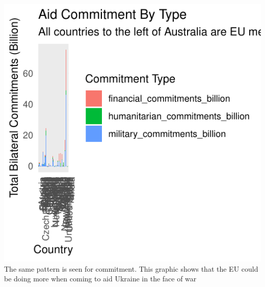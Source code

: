 \documentclass[11pt,preprint, authoryear]{elsarticle}
\numberwithin{equation}{section}
\numberwithin{figure}{section}
\numberwithin{table}{section}
\begin{document}
\begin{Shaded}
\begin{Highlighting}[]
\end{Highlighting}
\end{Shaded}

\includegraphics{Question_3_files/figure-latex/unnamed-chunk-4-1.pdf}
The same pattern is seen for commitment. This graphic shows that the EU
could be doing more when coming to aid Ukraine in the face of war


\end{document}
